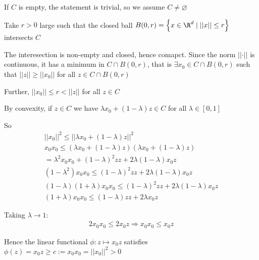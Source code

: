 \begin{prf}[]{}
  If $C$ is empty, the statement is trivial, so we assume $C\neq\varnothing$\par
\noindent Take $r>0$ large such that the closed ball $B(0,r) = \left\{x\in\R^d\mid\left|\left|x\right|\right|\leq r\right\}$ intersects $C$
\par\bigskip
\noindent The interesection is non-empty and closed, hence comapct. Since the norm $\left|\left|\cdot\right|\right|$ is continuous, it has a minimum in $C\cap B(0,r)$, that is $\exists x_0\in C\cap B(0,r)$ such that $\left|\left|z\right|\right|\geq \left|\left|x_0\right|\right|$ for all $z\in C\cap B(0,r)$\par
\noindent Further, $\left|\left|x_0\right|\right|\leq r<\left|\left|z\right|\right|$ for all $z\in C$\par
\noindent By convexity, if $z\in C$ we have $\lambda x_0+(1-\lambda)z\in C$ for all $\lambda\in [0,1]$
\par\bigskip
\noindent So
\begin{equation*}
  \begin{gathered}
    \left|\left|x_0\right|\right|^2\leq \left|\left|\lambda x_0+(1-\lambda)z\right|\right|^2\\
    x_0x_0\leq (\lambda x_0+(1-\lambda)z)(\lambda x_0+(1-\lambda)z)\\
    =\lambda^2 x_0x_0 + (1-\lambda)^2 zz + 2\lambda(1-\lambda)x_0z\\
    (1-\lambda^2)x_0x_0\leq (1-\lambda)^2zz+2\lambda(1-\lambda)x_0z\\
    (1-\lambda)(1+\lambda)x_0x_0\leq (1-\lambda)^2zz+2\lambda(1-\lambda)x_0z\\
    (1+\lambda)x_0x_0\leq (1-\lambda)zz+2\lambda x_0z
  \end{gathered}
\end{equation*}\par
\noindent Taking $\lambda\to1$:
\begin{equation*}
  \begin{gathered}
    2x_0x_0\leq 2x_0z\Rightarrow x_0x_0\leq x_0z
  \end{gathered}
\end{equation*}\par
\noindent Hence the linear functional $\phi:z\mapsto x_0z$ satisfies $\phi(z) = x_0z\geq c:=x_0x_0=\left|\left|x_0\right|\right|^2>0$
\end{prf}
\par\bigskip
